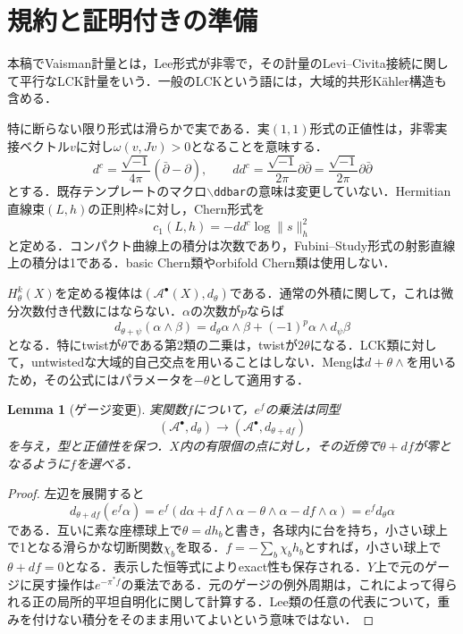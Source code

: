 \documentclass[12pt]{amsart}
\newtheorem{lem}[thm]{Lemma}
\theoremstyle{definition}
\theoremstyle{remark}
\numberwithin{equation}{section}
\newcommand{\cA}{\mathcal{A}}
\newcommand{\ddbar}{\frac{\sqrt{-1}}{2\pi} \partial \bar{\partial}}
\begin{document}
\section{規約と証明付きの準備}\label{sec:prelim}
本稿でVaisman計量とは，Lee形式が非零で，その計量のLevi--Civita接続に関して平行なLCK計量をいう．一般のLCKという語には，大域的共形K\"ahler構造も含める．

特に断らない限り形式は滑らかで実である．実$(1,1)$形式の正値性は，非零実接ベクトル$v$に対し$\omega(v,Jv)>0$となることを意味する．
\begin{equation}\label{eq:dc}
 d^c=\frac{\sqrt{-1}}{4\pi}(\bar\partial-\partial),\qquad
 dd^c=\frac{\sqrt{-1}}{2\pi}\partial\bar\partial=\ddbar
\end{equation}
とする．既存テンプレートのマクロ$\backslash$\texttt{ddbar}の意味は変更していない．Hermitian直線束$(L,h)$の正則枠$s$に対し，Chern形式を
\begin{equation}\label{eq:chern}
 c_1(L,h)=-dd^c\log\|s\|_h^2
\end{equation}
と定める．コンパクト曲線上の積分は次数であり，Fubini--Study形式の射影直線上の積分は1である．basic Chern類やorbifold Chern類は使用しない．

$H^k_\theta(X)$を定める複体は$(\cA^\bullet(X),d_\theta)$である．通常の外積に関して，これは微分次数付き代数にはならない．$\alpha$の次数が$p$ならば
\begin{equation}\label{eq:product}
 d_{\theta+\psi}(\alpha\wedge\beta)
 =d_\theta\alpha\wedge\beta+(-1)^p\alpha\wedge d_\psi\beta
\end{equation}
となる．特にtwistが$\theta$である第2類の二乗は，twistが$2\theta$になる．LCK類に対して，untwistedな大域的自己交点を用いることはしない．Mengは$d+\theta\wedge$を用いるため，その公式にはパラメータを$-\theta$として適用する．

\begin{lem}[ゲージ変更]\label{lem:gauge}
実関数$f$について，$e^f$の乗法は同型
\[
 (\cA^\bullet,d_\theta)\longrightarrow(\cA^\bullet,d_{\theta+df})
\]
を与え，型と正値性を保つ．$X$内の有限個の点に対し，その近傍で$\theta+df$が零となるように$f$を選べる．
\end{lem}
\begin{proof}
左辺を展開すると
\[
 d_{\theta+df}(e^f\alpha)
 =e^f(d\alpha+df\wedge\alpha-\theta\wedge\alpha-df\wedge\alpha)
 =e^fd_\theta\alpha
\]
である．互いに素な座標球上で$\theta=dh_b$と書き，各球内に台を持ち，小さい球上で1となる滑らかな切断関数$\chi_b$を取る．$f=-\sum_b\chi_bh_b$とすれば，小さい球上で$\theta+df=0$となる．表示した恒等式によりexact性も保存される．$Y$上で元のゲージに戻す操作は$e^{-\pi^*f}$の乗法である．元のゲージの例外周期は，これによって得られる正の局所的平坦自明化に関して計算する．Lee類の任意の代表について，重みを付けない積分をそのまま用いてよいという意味ではない．
\end{proof}
\end{document}
